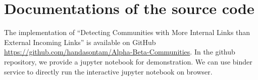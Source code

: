 \section{Documentations of the source code}

The implementation of
“Detecting  Communities with More Internal Links than External Incoming Links” is available on GitHub \url{https://github.com/handasontam/Alpha-Beta-Communities}.
In the github repository, we provide a jupyter notebook for demonstration. 
We can use binder service \cite{ragan2018binder} to directly run the interactive jupyter notebook on browser.




